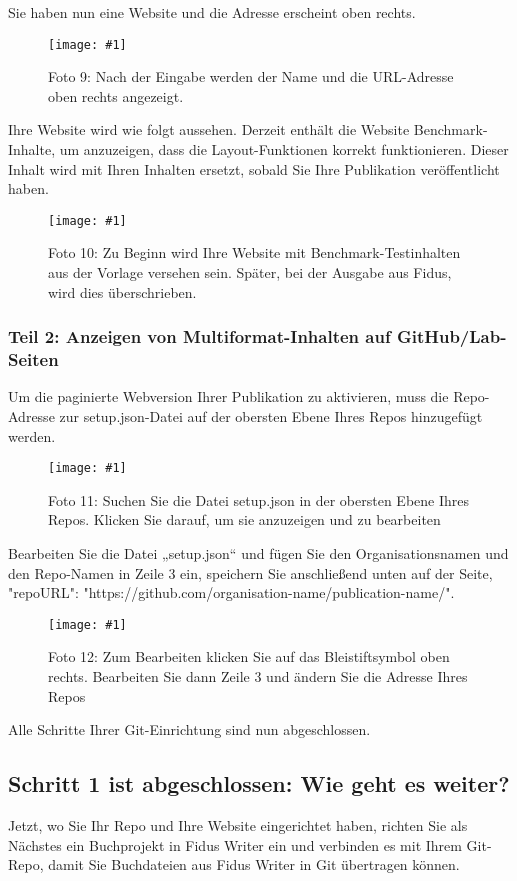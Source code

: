 \documentclass{article}
\newlength{\imgwidth}
\newcommand\scaledgraphics[2]{%
                
\settowidth{\imgwidth}{\texttt{[image: \#1]}}%
                
\setlength{\imgwidth}{\minof{\imgwidth}{#2\textwidth}}%
                
\texttt{[image: \#1]}%
                
}
\begin{document}
Sie haben nun eine Website und die Adresse erscheint oben rechts.

\begin{figure}
\scaledgraphics{f4544e29-1d39-4948-a754-7554fcddb8ad.png}{1}
\caption*{Foto 9: Nach der Eingabe werden der Name und die URL-Adresse oben rechts angezeigt.}\label{F98414411}
\end{figure}


Ihre Website wird wie folgt aussehen. Derzeit enthält die Website Benchmark-Inhalte, um anzuzeigen, dass die Layout-Funktionen korrekt funktionieren. Dieser Inhalt wird mit Ihren Inhalten ersetzt, sobald Sie Ihre Publikation veröffentlicht haben.

\begin{figure}
\scaledgraphics{29112ec9-518c-4a92-a6fc-237fc26b41b8.png}{1}
\caption*{Foto 10: Zu Beginn wird Ihre Website mit Benchmark-Testinhalten aus der Vorlage versehen sein. Später, bei der Ausgabe aus Fidus, wird dies überschrieben.}\label{F91564721}
\end{figure}


\subsubsection{Teil 2: Anzeigen von Multiformat-Inhalten auf GitHub/Lab-Seiten}\label{H5915252}



Um die paginierte Webversion Ihrer Publikation zu aktivieren, muss die Repo-Adresse zur setup.json-Datei auf der obersten Ebene Ihres Repos hinzugefügt werden.

\begin{figure}
\scaledgraphics{937e8cc0-b575-4ebe-acc3-4faf51c83ced.png}{1}
\caption*{Foto 11: Suchen Sie die Datei setup.json in der obersten Ebene Ihres Repos. Klicken Sie darauf, um sie anzuzeigen und zu bearbeiten}\label{F8474601}
\end{figure}


Bearbeiten Sie die Datei „setup.json“ und fügen Sie den Organisationsnamen und den Repo-Namen in Zeile 3 ein, speichern Sie anschließend unten auf der Seite, "repoURL": "https://github.com/organisation-name/publication-name/".

\begin{figure}
\scaledgraphics{8e9e4c18-b941-4173-b655-fe716a42a060.png}{1}
\caption*{Foto 12: Zum Bearbeiten klicken Sie auf das Bleistiftsymbol oben rechts. Bearbeiten Sie dann Zeile 3 und ändern Sie die Adresse Ihres Repos}\label{F65883321}
\end{figure}


Alle Schritte Ihrer Git-Einrichtung sind nun abgeschlossen.


\subsection{Schritt 1 ist abgeschlossen: Wie geht es weiter?}\label{H2358897}



Jetzt, wo Sie Ihr Repo und Ihre Website eingerichtet haben, richten Sie als Nächstes ein Buchprojekt in Fidus Writer ein und verbinden es mit Ihrem Git-Repo, damit Sie Buchdateien aus Fidus Writer in Git übertragen können.
\end{document}

